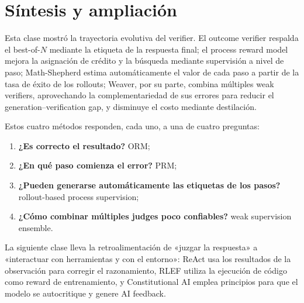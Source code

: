 \section{Síntesis y ampliación}

Esta clase mostró la trayectoria evolutiva del verifier. El outcome verifier respalda el best-of-$N$ mediante la etiqueta de la respuesta final; el process reward model mejora la asignación de crédito y la búsqueda mediante supervisión a nivel de paso; Math-Shepherd estima automáticamente el valor de cada paso a partir de la tasa de éxito de los rollouts; Weaver, por su parte, combina múltiples weak verifiers, aprovechando la complementariedad de sus errores para reducir el generation--verification gap, y disminuye el costo mediante destilación.

Estos cuatro métodos responden, cada uno, a una de cuatro preguntas:

\begin{enumerate}
    \item \textbf{¿Es correcto el resultado?} ORM;
    \item \textbf{¿En qué paso comienza el error?} PRM;
    \item \textbf{¿Pueden generarse automáticamente las etiquetas de los pasos?} rollout-based process supervision;
    \item \textbf{¿Cómo combinar múltiples judges poco confiables?} weak supervision ensemble.
\end{enumerate}

La siguiente clase lleva la retroalimentación de «juzgar la respuesta» a «interactuar con herramientas y con el entorno»: ReAct usa los resultados de la observación para corregir el razonamiento, RLEF utiliza la ejecución de código como reward de entrenamiento, y Constitutional AI emplea principios para que el modelo se autocritique y genere AI feedback.


